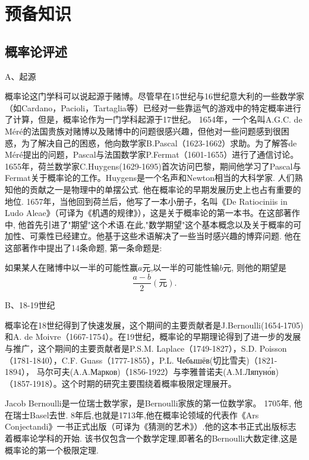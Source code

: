 %

\setcounter{chapter}{-1}
\chapter{预备知识}

%

\section{概率论评述}

A、起源

概率论这门学科可以说起源于赌博。尽管早在15世纪与16世纪意大利的一些数学家（如Cardano，Pacioli，Tartaglia等）已经对一些靠运气的游戏中的特定概率进行了计算，但是，概率论作为一门学科起源于17世纪。
1654年，一个名叫A.G.C. de Méré的法国贵族对赌博以及赌博中的问题很感兴趣，但他对一些问题感到很困惑，为了解决自己的困惑，他向数学家B.Pascal（1623-1662）求助。为了解答de Méré提出的问题，Pascal与法国数学家P.Fermat（1601-1655）进行了通信讨论。1655年，荷兰数学家C.Huygens(1629-1695)首次访问巴黎，期间他学习了Pascal与Fermat关于概率论的工作。Huygens是一个名声和Newton相当的大科学家. 人们熟知他的贡献之一是物理中的单摆公式. 他在概率论的早期发展历史上也占有重要的地位. 1657年，当他回到荷兰后，他写了一本小册子，名叫《De Ratiociniis in Ludo Aleae》（可译为《机遇的规律》），这是关于概率论的第一本书。在这部著作中, 他首先引进了"期望"这个术语.在此,"数学期望"这个基本概念以及关于概率的可加性、可乘性已经建立。他基于这些术语解决了一些当时感兴趣的博弈问题. 他在这部著作中提出了14条命题, 第一条命题是:

如果某人在赌博中以一半的可能性赢$a$元,以一半的可能性输$b$元, 则他的期望是\begin{equation}
	\frac{a-b}{2} (\text{元}).
\end{equation}

B、18-19世纪

概率论在18世纪得到了快速发展，这个期间的主要贡献者是J.Bernoulli(1654-1705)和A. de Moivre（1667-1754）。在19世纪，概率论的早期理论得到了进一步的发展与推广，这个期间的主要贡献者是P.S.M. Laplace（1749-1827），S.D. Poisson（1781-1840），C.F. Guass（1777-1855），P.L. Чебышёв(切比雪夫)（1821-1894）， 马尔可夫(A.A.Марков)（1856-1922）与李雅普诺夫(A.M.Ляпуно́в)（1857-1918）。这个时期的研究主要围绕着概率极限定理展开。


Jacob Bernoulli是一位瑞士数学家，是Bernoulli家族的第一位数学家。 1705年, 他在瑞士Basel去世. 8年后,也就是1713年,他在概率论领域的代表作《Ars Conjectandi》一书正式出版（可译为《猜测的艺术》）.他的这本书正式出版标志着概率论学科的开始. 该书仅包含一个数学定理,即著名的Bernoulli大数定律,这是概率论的第一个极限定理.

